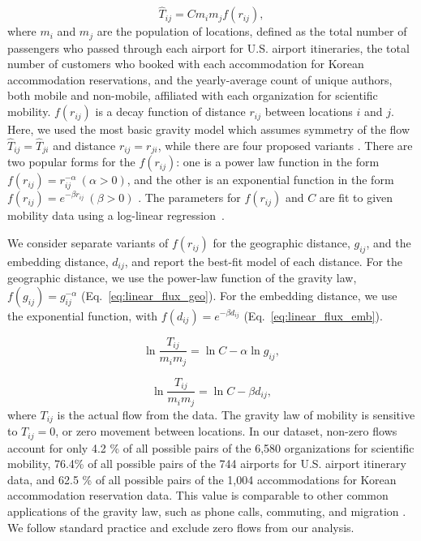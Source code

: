 \documentclass[12pt]{article} %
\begin{document}
%
%
\begin{equation}
	\label{eq:gravity_basic}
	\hat{T}_{ij} = Cm_{i}m_{j}f(r_{ij}),
\end{equation}
where $m_{i}$ and $m_{j}$ are the population of locations, defined as the total number of passengers who passed through each airport for U.S. airport itineraries,  the total number of customers who booked with each accommodation for Korean accommodation reservations, and the yearly-average count of unique authors, both mobile and non-mobile, affiliated with each organization for scientific mobility.
$f(r_{ij})$ is a decay function of distance $r_{ij}$ between locations $i$ and $j$.
Here, we used the most basic gravity model which assumes symmetry of the flow $\hat{T}_{ij} =\hat{T}_{ji}$ and distance $r_{ij} = r_{ji}$, while there are four proposed variants \autocite{wilson2011entropy}.
There are two popular forms for the $f(r_{ij})$:
one is a power law function in the form $f(r_{ij})= r^{-\alpha}_{ij} \ (\alpha > 0)$, and the other is an exponential function in the form $f(r_{ij}) = e^{-\beta r_{ij}} \ (\beta > 0)$ \autocite{chen2015distance}.
The parameters for $f(r_{ij})$ and $C$ are fit to given mobility data using a log-linear regression~\autocite{jung2008highwaygravity, curiel2018citygravity, truscott2012epidemicgravity, hong2016busgravity, simini2012universal}.

We consider separate variants of $f(r_{ij})$ for the geographic distance, $g_{ij}$, and the embedding distance, $d_{ij}$, and report the best-fit model of each distance.
For the geographic distance, we use the power-law function of the gravity law, $f(g_{ij})= g^{-\alpha}_{ij}$ (Eq.~\ref{eq:linear_flux_geo}).
For the embedding distance, we use the exponential function, with $f(d_{ij}) = e^{-\beta d_{ij}}$ (Eq.~\ref{eq:linear_flux_emb}).

\begin{equation}
	\label{eq:linear_flux_geo}
	\ln\frac{T_{ij}}{m_im_j} = \ln C  - \alpha \ln g_{ij},
\end{equation}

\begin{equation}
	\label{eq:linear_flux_emb}
	\ln\frac{T_{ij}}{m_im_j} = \ln C - \beta d_{ij},
\end{equation}
where $T_{ij}$ is the actual flow from the data.
The gravity law of mobility is sensitive to $T_{ij} = 0$, or zero movement between locations.
In our dataset, non-zero flows account for only 4.2 \% of all possible pairs of the 6,580 organizations for scientific mobility, 76.4\% of all possible pairs of the 744 airports for U.S. airport itinerary data, and 62.5 \% of all possible pairs of the 1,004 accommodations for Korean accommodation reservation data.
This value is comparable to other common applications of the gravity law, such as phone calls, commuting, and migration \autocite{simini2012universal}.
We follow standard practice and exclude zero flows from our analysis.
\end{document}
